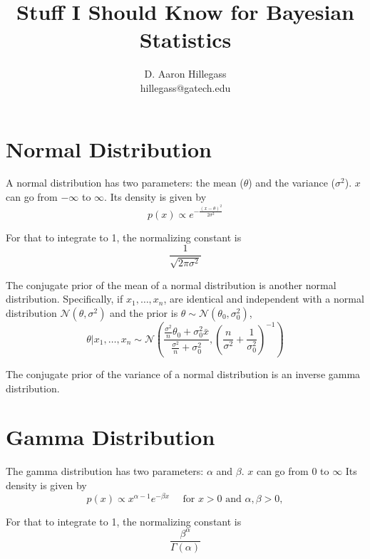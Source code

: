 \documentclass[12pt]{article}
\begin{document}
\title{Stuff I Should Know for Bayesian Statistics}
\author{D. Aaron Hillegass \\hillegass@gatech.edu}
\maketitle

\section*{Normal Distribution}

A normal distribution has two parameters: the mean ($\theta$) and the variance ($\sigma^2$). $x$ can go from $-\infty$ to $\infty$. Its density is given by
\begin{equation*}
p(x) \propto e^{-\frac{(x - \theta)^2}{2\sigma^2}}
\end{equation*}

For that to integrate to 1, the normalizing constant is
\begin{equation*}
\frac{1}{\sqrt{2\pi\sigma^2}}
\end{equation*}

The conjugate prior of the mean of a normal distribution is another normal distribution. Specifically, if $x_1, \dots, x_n$, are identical and independent with a normal distribution $\mathcal{N}(\theta, \sigma^2)$ and the prior is $\theta \sim  \mathcal{N}(\theta_0, \sigma_0^2)$,
\begin{equation*}
\theta | x_1,\ldots,x_n \sim \mathcal{N}\left( \frac{\frac{\sigma^2}{n}\theta_0 + \sigma_0^2\bar{x}}{\frac{\sigma^2}{n}+\sigma_0^2},\left( \frac{n}{\sigma^2} + \frac{1}{\sigma_0^2} \right)^{-1} \right)
\end{equation*}

The conjugate prior of the variance of a normal distribution is an inverse gamma distribution.

\section*{Gamma Distribution}

The gamma distribution has two parameters: $\alpha$ and $\beta$. $x$ can go from $0$ to $\infty$ Its density is given by
\begin{equation*}
p(x) \propto   x^{\alpha-1} e^{-\beta x} \quad \text{ for } x > 0 \text{ and } \alpha, \beta > 0,
\end{equation*}

For that to integrate to 1, the normalizing constant is
\begin{equation*}
\frac{ \beta^\alpha}{\Gamma(\alpha)}
\end{equation*}
\end{document}
